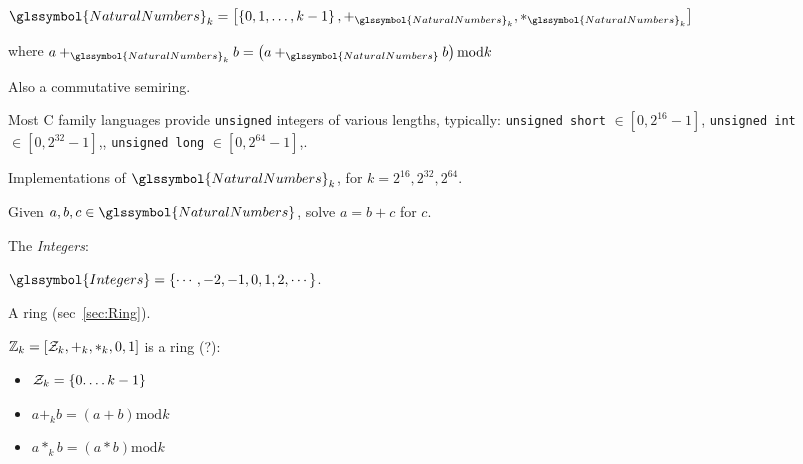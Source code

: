 ${\glssymbol{NaturalNumbers}}_{k} = 
\left[ \left\{ 0, 1, \ldots, k-1 \right\},
+_{\glssymbol{NaturalNumbers}_{k}},
*_{\glssymbol{NaturalNumbers}_{k}} \right]$

where
$a +_{\glssymbol{NaturalNumbers}_{k}} b =
\left( a +_{\glssymbol{NaturalNumbers}} b \right) \text{mod} k$

Also a commutative semiring.

\label{sec:unsigned-int}

Most C family languages provide \texttt{unsigned} integers
of various lengths, typically: 
\texttt{unsigned short} $\in \left[ 0, 2^{16} - 1 \right]$,
\texttt{unsigned int} $\in \left[ 0, 2^{32} - 1 \right]$,,
\texttt{unsigned long} $\in \left[ 0, 2^{64} - 1 \right]$,.

Implementations of $\glssymbol{NaturalNumbers}_{k}$,
for $k = 2^{16}, 2^{32}, 2^{64}$.

\label{sec:Integers}

Given $a,b,c \in \glssymbol{NaturalNumbers}$,
solve $a = b + c$ for $c$.

The \textit{\gls{Integers}}: 

$\glssymbol{Integers} = \{\cdots, -2, -1, 0, 1, 2, \cdots\}$.

A ring (sec~\ref{sec:Ring}).

\label{sec:Cyclic-integers}

$\mathbb{Z}_{k} = \left[ \mathcal{Z}_{k}, +_k, *_k, 0, 1 \right]$
is a ring (?):
\begin{itemize}
  \item $\mathcal{Z}_{k} = \left\{ 0. \ldots k-1  \right\}$
  \item $ a +_k b = \left( a + b \right) \text{mod} k$
  \item $ a *_k b = \left( a * b \right) \text{mod} k$
\end{itemize}

\label{sec:int}

